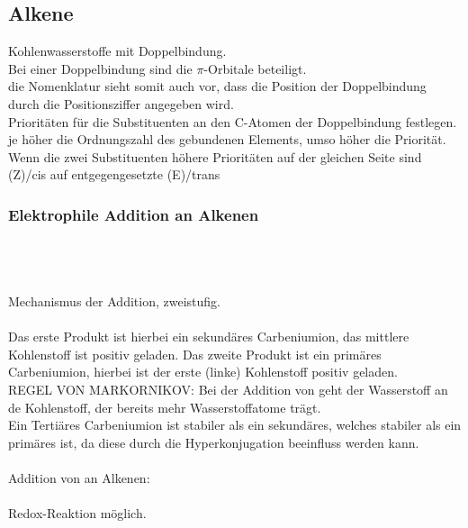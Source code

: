 \documentclass[a4paper, fleqn]{article}
\begin{document}
\subsection{Alkene}
Kohlenwasserstoffe mit Doppelbindung.\\
Bei einer Doppelbindung sind die $\pi$-Orbitale beteiligt.\\
die Nomenklatur sieht somit auch vor, dass die Position der Doppelbindung durch die Positionsziffer angegeben wird.\\
Priorit\"aten f\"ur die Substituenten an den C-Atomen der Doppelbindung festlegen.\\
je h\"oher die Ordnungszahl des gebundenen Elements, umso h\"oher die Priorit\"at.\\
Wenn die zwei Substituenten h\"ohere Priorit\"aten auf der gleichen Seite sind (Z)/cis auf entgegengesetzte (E)/trans

\subsubsection{Elektrophile Addition an Alkenen}
\\
\\
\\

Mechanismus der Addition, zweistufig.\\
\\
Das erste Produkt ist hierbei ein sekund\"ares Carbeniumion, das mittlere Kohlenstoff ist positiv geladen. Das zweite Produkt ist ein prim\"ares Carbeniumion, hierbei ist der erste (linke) Kohlenstoff positiv geladen.\\
REGEL VON MARKORNIKOV: Bei der Addition von  geht der Wasserstoff an de Kohlenstoff, der bereits mehr Wasserstoffatome tr\"agt.\\
Ein Terti\"ares Carbeniumion ist stabiler als ein sekund\"ares, welches stabiler als ein prim\"ares ist, da diese durch die Hyperkonjugation beeinfluss werden kann.\\\\

Addition von  an Alkenen:\\
\\
Redox-Reaktion m\"oglich.\\
\\
\end{document}
